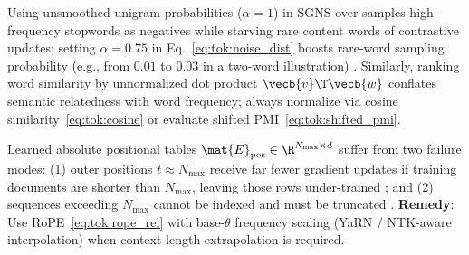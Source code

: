 \documentclass[../../../../master.tex]{subfiles}
\begin{document}
\begin{pitfall}[Unsmoothed Noise Sampling ($\alpha=1$) and Raw Dot-Product Bias]
Using unsmoothed unigram probabilities ($\alpha=1$) in SGNS over-samples high-frequency stopwords as negatives while starving rare content words of contrastive updates; setting $\alpha=0.75$ in Eq.~\eqref{eq:tok:noise_dist} boosts rare-word sampling probability (e.g., from $0.01$ to $0.03$ in a two-word illustration) . Similarly, ranking word similarity by unnormalized dot product $\vecb{v}\T \vecb{w}$ conflates semantic relatedness with word frequency; always normalize via cosine similarity~\eqref{eq:tok:cosine} or evaluate shifted PMI~\eqref{eq:tok:shifted_pmi}.
\end{pitfall}

\begin{pitfall}
Learned absolute positional tables $\mat{E}_{\mathrm{pos}} \in \R^{N_{\max} \times d}$ suffer from two failure modes: (1) outer positions $t \approx N_{\max}$ receive far fewer gradient updates if training documents are shorter than $N_{\max}$, leaving those rows under-trained ; and (2) sequences exceeding $N_{\max}$ cannot be indexed and must be truncated . \textbf{Remedy}: Use RoPE~\eqref{eq:tok:rope_rel} with base-$\theta$ frequency scaling (YaRN / NTK-aware interpolation) when context-length extrapolation is required.
\end{pitfall}
\end{document}
